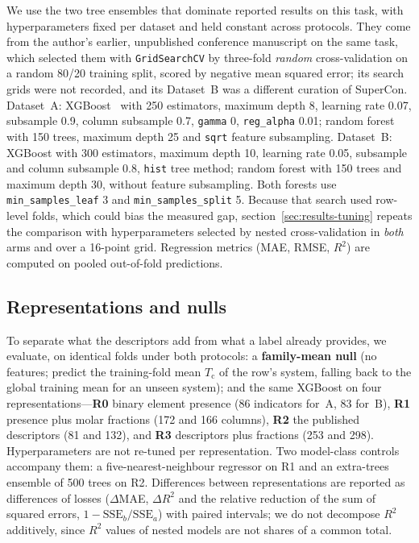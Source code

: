 \documentclass{iopjournal}
\newcommand{\Tc}{T_{\mathrm c}}
\newcommand{\Rsq}{R^{2}}
\begin{document}
We use the two tree ensembles that dominate reported results on this task, with hyperparameters fixed per dataset and held constant across protocols. They come from the author's earlier, unpublished conference manuscript on the same task, which selected them with \texttt{GridSearchCV} by three-fold \emph{random} cross-validation on a random 80/20 training split, scored by negative mean squared error; its search grids were not recorded, and its Dataset~B was a different curation of SuperCon. Dataset~A:
XGBoost~\cite{chen2016} with \num{250} estimators, maximum depth \num{8}, learning rate \num{0.07},
subsample \num{0.9}, column subsample \num{0.7}, \texttt{gamma} \num{0}, \texttt{reg\_alpha}
\num{0.01}; random forest with \num{150} trees, maximum depth \num{25} and \texttt{sqrt} feature
subsampling. Dataset~B: XGBoost with \num{300} estimators, maximum depth \num{10}, learning rate
\num{0.05}, subsample and column subsample \num{0.8}, \texttt{hist} tree method; random forest with
\num{150} trees and maximum depth \num{30}, without feature subsampling. Both forests use
\texttt{min\_samples\_leaf} \num{3} and \texttt{min\_samples\_split} \num{5}. Because that search used
row-level folds, which could bias the measured gap, section~\ref{sec:results-tuning} repeats the comparison with
hyperparameters selected by nested cross-validation in \emph{both} arms and over a \num{16}-point
grid. Regression metrics (MAE, RMSE, $\Rsq$) are computed on pooled out-of-fold predictions.

\subsection{Representations and nulls}
\label{sec:nulls}

To separate what the descriptors add from what a label already provides, we evaluate, on identical
folds under both protocols: a \textbf{family-mean null} (no features; predict the training-fold
mean $\Tc$ of the row's system, falling back to the global training mean for an unseen system);
and the same XGBoost on four representations---\textbf{R0} binary element presence
(\num{86} indicators for~A, \num{83} for~B), \textbf{R1} presence plus molar fractions
(\num{172} and \num{166} columns), \textbf{R2} the published descriptors (\num{81} and \num{132}),
and \textbf{R3} descriptors plus fractions (\num{253} and \num{298}). Hyperparameters are not
re-tuned per representation. Two model-class controls accompany them: a five-nearest-neighbour
regressor on R1 and an extra-trees ensemble of \num{500} trees on R2. Differences between
representations are reported as differences of losses ($\Delta$MAE, $\Delta\Rsq$ and the relative
reduction of the sum of squared errors, $1 - \mathrm{SSE}_b/\mathrm{SSE}_a$) with paired intervals;
we do not decompose $\Rsq$ additively, since $\Rsq$ values of nested models are not shares of a
common total.
\end{document}
